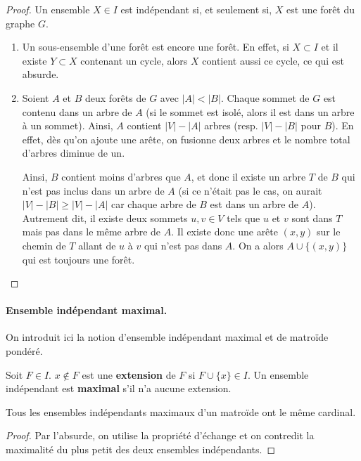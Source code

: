 \begin{proof}
Un ensemble $X\in I$ est indépendant si, et seulement si, $X$ est une forêt du graphe $G$.

\begin{enumerate}
\item Un sous-ensemble d'une forêt est encore une forêt. En effet, si $X\subset I$ et il existe $Y\subset X$ contenant un cycle, alors $X$ contient aussi ce cycle, ce qui est absurde.

\item Soient $A$ et $B$ deux forêts de $G$ avec $|A| <|B|$. Chaque sommet de $G$ est contenu dans un arbre de $A$ (si le sommet est isolé, alors il est dans un arbre à un sommet). Ainsi, $A$ contient $|V|-|A|$ arbres (resp. $|V|-|B|$ pour $B$). En effet, dès qu'on ajoute une arête, on fusionne deux arbres et le nombre total d'arbres diminue de un.

Ainsi, $B$ contient moins d'arbres que $A$, et donc il existe un arbre $T$ de $B$ qui n'est pas inclus dans un arbre de $A$ (si ce n'était pas le cas, on aurait $|V|-|B|\geq|V|-|A|$ car chaque arbre de $B$ est dans un arbre de $A$). Autrement dit, il existe deux sommets $u,v\in V$ tels que $u$ et $v$ sont dans $T$ mais pas dans le même arbre de $A$. Il existe donc une arête $(x,y)$ sur le chemin de $T$ allant de $u$ à $v$ qui n'est pas dans $A$. On a alors $A\cup\{(x,y)\}$ qui est toujours une forêt.
\end{enumerate}
\end{proof}


\paragraph{Ensemble indépendant maximal.} On introduit ici la notion d'ensemble indépendant maximal et de matroïde pondéré.

\begin{definition}
Soit $F\in I$. $x\notin F$ est une \textbf{extension} de $F$ si $F\cup \{x\} \in I$. Un ensemble indépendant est \textbf{maximal} s'il n'a aucune extension.
\end{definition}

\begin{lemma}
Tous les ensembles indépendants maximaux d'un matroïde ont le même cardinal.
\end{lemma}

\begin{proof}
Par l'absurde, on utilise la propriété d'échange et on contredit la maximalité du plus petit des deux ensembles indépendants.
\end{proof}

